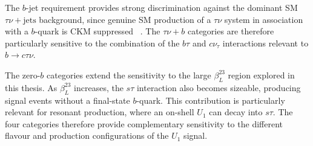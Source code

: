 The $b$-jet requirement provides strong discrimination against the dominant SM $\tau\nu+\mathrm{jets}$ background, since genuine SM production of a $\tau\nu$ system in association with a $b$-quark is CKM suppressed ~\cite{Endo2022NonResonant}. The $\tau\nu+b$ categories are therefore particularly sensitive to the combination of the $b\tau$ and $c\nu_{\tau}$ interactions relevant to $b\rightarrow c\tau\nu$.

The zero-$b$ categories extend the sensitivity to the large $\beta_{L}^{23}$ region explored in this thesis. As $\beta_{L}^{23}$ increases, the $s\tau$ interaction also becomes sizeable, producing signal events without a final-state $b$-quark. This contribution is particularly relevant for resonant production, where an on-shell $U_{1}$ can decay into $s\tau$. The four categories therefore provide complementary sensitivity to the different flavour and production configurations of the $U_{1}$ signal.

